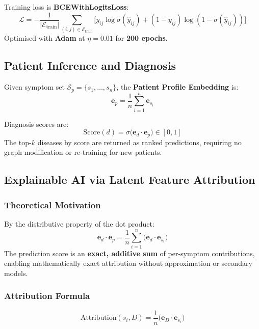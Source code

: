 \documentclass[conference]{IEEEtran}
\begin{document}
Training loss is \textbf{BCEWithLogitsLoss}:
\begin{equation}
  \mathcal{L} = -\frac{1}{|\mathcal{E}_{\mathrm{train}}|}
    \sum_{(i,j)\in\mathcal{E}_{\mathrm{train}}}
    \bigl[y_{ij}\log\sigma(\hat{y}_{ij})
    +(1-y_{ij})\log(1-\sigma(\hat{y}_{ij}))\bigr]
  \label{eq:bceloss}
\end{equation}
Optimised with \textbf{Adam} at $\eta=0.01$ for \textbf{200 epochs}.

\subsection{Patient Inference and Diagnosis}

Given symptom set $\mathcal{S}_p=\{s_1,\ldots,s_n\}$, the
\textbf{Patient Profile Embedding} is:
\begin{equation}
  \mathbf{e}_p = \frac{1}{n}\sum_{i=1}^{n}\mathbf{e}_{s_i}
  \label{eq:patientembed}
\end{equation}

Diagnosis scores are:
\begin{equation}
  \mathrm{Score}(d) = \sigma\bigl(\mathbf{e}_d\cdot\mathbf{e}_p\bigr)
    \in[0,1]
  \label{eq:score}
\end{equation}
The top-$k$ diseases by score are returned as ranked predictions,
requiring no graph modification or re-training for new patients.

\subsection{Explainable AI via Latent Feature Attribution}

\subsubsection{Theoretical Motivation}
By the distributive property of the dot product:
\begin{equation}
  \mathbf{e}_d\cdot\mathbf{e}_p
    = \frac{1}{n}\sum_{i=1}^{n}\bigl(\mathbf{e}_d\cdot\mathbf{e}_{s_i}\bigr)
  \label{eq:decompose}
\end{equation}
The prediction score is an \textbf{exact, additive sum} of
per-symptom contributions, enabling mathematically exact attribution
without approximation or secondary models.

\subsubsection{Attribution Formula}
\begin{equation}
  \mathrm{Attribution}(s_i, D)
    = \frac{1}{n}\bigl(\mathbf{e}_D\cdot\mathbf{e}_{s_i}\bigr)
  \label{eq:attribution}
\end{equation}
\end{document}

